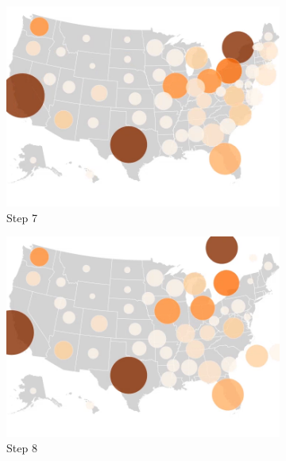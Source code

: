\begin{figure}
    \begin{subfigure}[b]{0.31\textwidth}
        \centering
        \includegraphics[width=\textwidth]{images/results/dot_cartogram/transition_7.png}
        \caption[]%
        {{\small Step 7}}
    \end{subfigure}
    \hfill
    \begin{subfigure}[b]{0.31\textwidth}
        \centering
        \includegraphics[width=\textwidth]{images/results/dot_cartogram/transition_8.png}
        \caption[]%
        {{\small Step 8}}
    \end{subfigure}
    \hfill
    \begin{subfigure}[b]{0.31\textwidth}
        \centering

\end{subfigure}
\end{figure}
